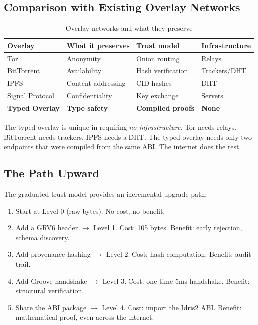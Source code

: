 \documentclass[11pt,a4paper]{article}
\begin{document}
\subsection{Comparison with Existing Overlay Networks}

\begin{table}[h]
\centering
\small
\begin{tabular}{llll}
\toprule
Overlay & What it preserves & Trust model & Infrastructure \\
\midrule
Tor & Anonymity & Onion routing & Relays \\
BitTorrent & Availability & Hash verification & Trackers/DHT \\
IPFS & Content addressing & CID hashes & DHT \\
Signal Protocol & Confidentiality & Key exchange & Servers \\
\textbf{Typed Overlay} & \textbf{Type safety} & \textbf{Compiled proofs} & \textbf{None} \\
\bottomrule
\end{tabular}
\caption{Overlay networks and what they preserve}
\end{table}

The typed overlay is unique in requiring \emph{no infrastructure}. Tor
needs relays. BitTorrent needs trackers. IPFS needs a DHT. The typed
overlay needs only two endpoints that were compiled from the same ABI.
The internet does the rest.

\subsection{The Path Upward}

The graduated trust model provides an incremental upgrade path:

\begin{enumerate}
\item Start at Level 0 (raw bytes). No cost, no benefit.
\item Add a GRV6 header $\rightarrow$ Level 1. Cost: 105 bytes. Benefit:
  early rejection, schema discovery.
\item Add provenance hashing $\rightarrow$ Level 2. Cost: hash
  computation. Benefit: audit trail.
\item Add Groove handshake $\rightarrow$ Level 3. Cost: one-time 5ms
  handshake. Benefit: structural verification.
\item Share the ABI package $\rightarrow$ Level 4. Cost: import the
  Idris2 ABI. Benefit: mathematical proof, even across the internet.
\end{enumerate}
\end{document}
